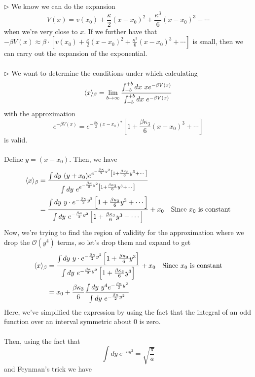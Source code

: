 \documentclass[11pt]{article}
\begin{document}
$\triangleright$ We know we can do the expansion $$ V(x) = v(x_0) + \frac{\kappa}{2} (x-x_0)^2 + \frac{\kappa^3}{6} (x-x_0)^3 + \cdots $$ when we're very close to $x$. If we further have that $-\beta V(x) \approx \beta \cdot \left[v(x_0) + \frac{\kappa}{2} (x-x_0)^2 + \frac{\kappa^3}{6} (x-x_0)^3 + \cdots\right] $ is small, then we can carry out the expansion of the exponential. 
\\
\\
$\triangleright$ We want to determine the conditions under which calculating $$ \langle x \rangle_{\beta} = \lim_{b \rightarrow \infty} \frac{\int_{-b}^{+b} dx~xe^{-\beta V(x)}}{\int_{-b}^{+b} dx~e^{-\beta V(x)}} $$ with the approximation $$ e^{-\beta V(x)} = e^{-\frac{\beta \kappa}{2}(x-x_0)^2} \left[ 1 + \frac{\beta \kappa_3}{6}(x-x_0)^3 + \cdots \right] $$ is valid.
\\
\\
Define $y = (x-x_0)$. Then, we have 
\begin{align*}
  \langle x \rangle_{\beta} &= \frac{\int dy~(y+x_0)e^{e^{-\frac{\beta \kappa}{2}y^2} \left[ 1 + \frac{\beta \kappa_3}{6}y^3 + \cdots \right]  }}{\int dy~e^{e^{-\frac{\beta \kappa}{2}y^2} \left[ 1 + \frac{\beta \kappa_3}{6}y^3 + \cdots \right]  }} \\
  &= \frac{\int dy~y \cdot {e^{-\frac{\beta \kappa}{2}y^2} \left[ 1 + \frac{\beta \kappa_3}{6}y^3 + \cdots \right]  }}{\int dy~{e^{-\frac{\beta \kappa}{2}y^2} \left[ 1 + \frac{\beta \kappa_3}{6}y^3 + \cdots \right]  }} + x_0 ~~~ \text{Since $x_0$ is constant} \\
\end{align*} Now, we're trying to find the region of validity for the approximation where we drop the $\mathcal{O}(y^4)$ terms, so let's drop them and expand to get 
\begin{align*}
  \langle x \rangle_{\beta} &= \frac{\int dy~y \cdot {e^{-\frac{\beta \kappa}{2}y^2} \left[ 1 + \frac{\beta \kappa_3}{6}y^3 \right]  }}{\int dy~{e^{-\frac{\beta \kappa}{2}y^2} \left[ 1 + \frac{\beta \kappa_3}{6}y^3 \right]  }} + x_0 ~~~ \text{Since $x_0$ is constant}  \\
  &= x_0 + \frac{\beta \kappa_3}{6} \frac{\int dy~y^4{e^{-\frac{\beta \kappa}{2}y^2} }}{\int dy~{e^{-\frac{\beta \kappa}{2}y^2} }} 
\end{align*} Here, we've simplified the expression by using the fact that the integral of an odd function over an interval symmetric about $0$ is zero.
\\
\\
Then, using the fact that $$ \int dy~e^{-ay^2} = \sqrt{\frac{\pi}{a}} $$ and Feynman's trick we have
\end{document}
